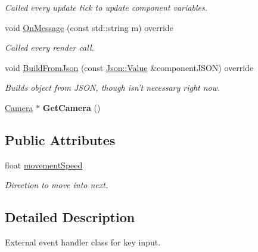 \begin{DoxyCompactItemize}
\begin{DoxyCompactList}\small\item\em Called every update tick to update component variables. \end{DoxyCompactList}\item 
void \hyperlink{class_player_component_abf177968c3355b3152eed62879a6cfe6}{On\+Message} (const std\+::string m) override
\begin{DoxyCompactList}\small\item\em Called every render call. \end{DoxyCompactList}\item 
\hypertarget{class_player_component_a683e8e6b11f8b26568d8c2c8f77fc4a6}{void \hyperlink{class_player_component_a683e8e6b11f8b26568d8c2c8f77fc4a6}{Build\+From\+Json} (const \hyperlink{class_json_1_1_value}{Json\+::\+Value} \&component\+J\+S\+O\+N) override}\label{class_player_component_a683e8e6b11f8b26568d8c2c8f77fc4a6}

\begin{DoxyCompactList}\small\item\em Builds object from J\+S\+O\+N, though isn't necessary right now. \end{DoxyCompactList}\item 
\hypertarget{class_player_component_ac69d2de4717b93332bd3e52fac29eab7}{\hyperlink{class_camera}{Camera} $\ast$ {\bfseries Get\+Camera} ()}\label{class_player_component_ac69d2de4717b93332bd3e52fac29eab7}

\end{DoxyCompactItemize}
\subsection*{Public Attributes}
\begin{DoxyCompactItemize}
\item 
\hypertarget{class_player_component_ac3e853e9e00be90dfebbc3d06d445257}{float \hyperlink{class_player_component_ac3e853e9e00be90dfebbc3d06d445257}{movement\+Speed}}\label{class_player_component_ac3e853e9e00be90dfebbc3d06d445257}

\begin{DoxyCompactList}\small\item\em Direction to move into next. \end{DoxyCompactList}\end{DoxyCompactItemize}


\subsection{Detailed Description}
External event handler class for key input. 


